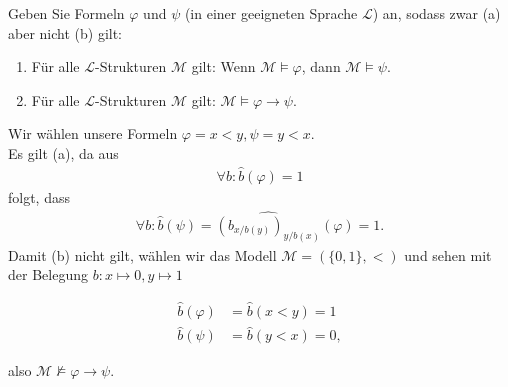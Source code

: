 
\begin{exercise}[92]

Geben Sie Formeln $\varphi$ und $\psi$ (in einer geeigneten Sprache $\mathscr{L}$)
an, sodass zwar (a) aber nicht (b) gilt:
\begin{enumerate}[label = \alph*)]
  \item Für alle $\mathscr{L}$-Strukturen $\mathscr{M}$ gilt:
  Wenn $\mathscr{M} \vDash \varphi$, dann $\mathscr{M} \vDash \psi$.
  \item Für alle $\mathscr{L}$-Strukturen $\mathscr{M}$ gilt:
  $\mathscr{M} \vDash \varphi \rightarrow \psi$.
\end{enumerate}

\end{exercise}


\begin{solution}

Wir wählen unsere Formeln $\varphi = x < y, \psi = y < x$. \\
Es gilt (a), da aus
\begin{align*}
  \forall b: \hat{b}(\varphi) = 1
\end{align*}
folgt, dass
\begin{align*}
  \forall b: \hat{b}(\psi) = \widehat{(b_{x/b(y)})_{y/b(x)}}(\varphi) = 1.
\end{align*}
Damit (b) nicht gilt, wählen wir das Modell $\mathscr{M} = (\{0,1\}, <)$ und sehen
mit der Belegung $b: x \mapsto 0, y \mapsto 1$

\begin{align*}
  \hat{b}(\varphi) &= \hat{b}(x < y) = 1 \\
  \hat{b}(\psi) &= \hat{b}(y < x) = 0,
\end{align*}

also $\mathscr{M} \nvDash \varphi \rightarrow \psi$.
\end{solution}

